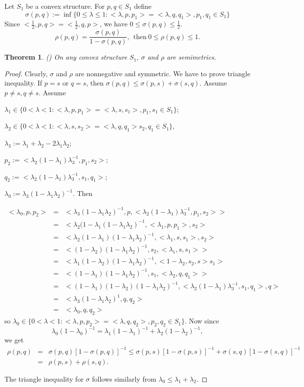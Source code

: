 \documentclass[12pt,letterpaper]{article}
\newtheorem{theorem}[lemma]{Theorem}
\begin{document}
Let $S_1$ be a convex structure. For $p,q\in S_1$ define
\[
\sigma(p,q):=\inf\{ 0\leq \lambda\leq 1:<\lambda,p,p_1>=<\lambda,q,q_1>, p_1,q_1\in S_1\}
\]
Since $<\frac{1}{2},p,q>=<\frac{1}{2},q,p>$, we have $0\leq \sigma(p,q)\leq \frac{1}{2}$.
\[
\rho(p,q)=\frac{\sigma(p,q)}{1-\sigma(p,q)}, \ \  \mbox{then}  \ 0\leq \rho(p,q)\leq 1.
\]

\begin{theorem}\label{sigmarho} (\cite{G}) On any convex structure  $S_1$, $\sigma$ and $\rho$ are semimetrics.
\end{theorem}
\begin{proof} Clearly, $\sigma$ and $\rho$ are nonnegative and symmetric. We have to prove triangle inequality.
If $p=s$ or $q=s$, then $\sigma(p,q)\leq \sigma(p,s)+\sigma(s,q)$. Assume $p\neq s, q\neq s$.
Assume

$\lambda_1\in \{ 0< \lambda < 1: <\lambda,p,p_1>=<\lambda,s,s_1>, p_1,s_1\in S_1\}$;

$\lambda_2\in\{0 < \lambda < 1:<\lambda,s,s_2>=<\lambda,q,q_1> s_2,q_1\in S_1\}$,

$\lambda_3:=\lambda_1+\lambda_2-2\lambda_1\lambda_2$;

$p_2:=<\lambda_2(1-\lambda_1)\lambda_3^{-1},p_1,s_2>$;

$q_2:=<\lambda_2(1-\lambda_1)\lambda_3^{-1},s_1,q_1>$;

$\lambda_0:=\lambda_3(1-\lambda_1\lambda_2)^{-1}$.
Then

\begin{eqnarray*} <\lambda_0,p,p_2> &=& <\lambda_3(1-\lambda_1\lambda_2)^{-1},p,<\lambda_2(1-\lambda_1)\lambda_3^{-1},p_1,s_2>>\\
&=&<\lambda_2(1-\lambda_1(1-\lambda_1\lambda_2)^{-1},<\lambda_1,p,p_1>,s_2>\\
&=&<\lambda_2(1-\lambda_1)(1-\lambda_1\lambda_2)^{-1},<\lambda_1,s,s_1>,s_2>\\
&=&<(1-\lambda_2)(1-\lambda_1\lambda_2)^{-1},s_2,<\lambda_1,s,s_1>>\\
&=&<\lambda_1(1-\lambda_2)(1-\lambda_1\lambda_2)^{-1},<1-\lambda_2,s_2,s>s_1>\\
&=&<(1-\lambda_1)(1-\lambda_1\lambda_2)^{-1},s_1,<\lambda_2,q,q_1>>\\
&=&<(1-\lambda_1)(1-\lambda_2)(1-\lambda_1\lambda_2)^{-1},<\lambda_2(1-\lambda_1)\lambda_3^{-1},s_1,q_1>,q>\\
&=&<\lambda_3(1-\lambda_1\lambda_2)^{1},q,q_2>\\
&=&<\lambda_0,q,q_2>
\end{eqnarray*}
so $\lambda_0\in \{ 0< \lambda <1: <\lambda,p,p_2>=<\lambda,q,q_2>, p_2,q_2\in S_1\}$. Now since
\[
\lambda_0(1-\lambda_0)^{-1}=\lambda_1(1-\lambda_1)^{-1}+\lambda_2(1-\lambda_2)^{-1},
\]
we get
\begin{eqnarray*}
\rho(p,q)&=&\sigma(p,q)[1-\sigma(p,q)]^{-1}\leq \sigma(p,s)[1-\sigma(p,s)]^{-1}+\sigma(s,q)[1-\sigma(s,q)]^{-1}\\
&=&\rho(p,s)+\rho(s,q).
\end{eqnarray*}

The triangle inequality for $\sigma$ follows similarly from $\lambda_0\leq \lambda_1+\lambda_2$.

\end{proof}
\end{document}
